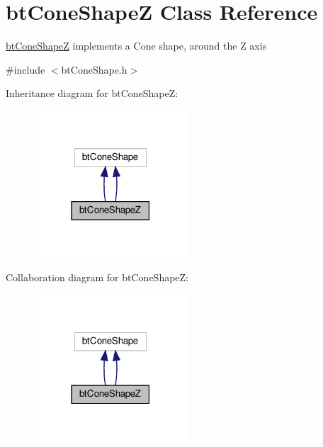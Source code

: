 \hypertarget{classbtConeShapeZ}{}\section{bt\+Cone\+ShapeZ Class Reference}
\label{classbtConeShapeZ}


\hyperlink{classbtConeShapeZ}{bt\+Cone\+ShapeZ} implements a Cone shape, around the Z axis  




{\ttfamily \#include $<$bt\+Cone\+Shape.\+h$>$}



Inheritance diagram for bt\+Cone\+ShapeZ\+:
\nopagebreak
\begin{figure}[H]
\begin{center}
\leavevmode
\includegraphics[width=162pt]{classbtConeShapeZ__inherit__graph}
\end{center}
\end{figure}


Collaboration diagram for bt\+Cone\+ShapeZ\+:
\nopagebreak
\begin{figure}[H]
\begin{center}
\leavevmode
\includegraphics[width=162pt]{classbtConeShapeZ__coll__graph}
\end{center}
\end{figure}
